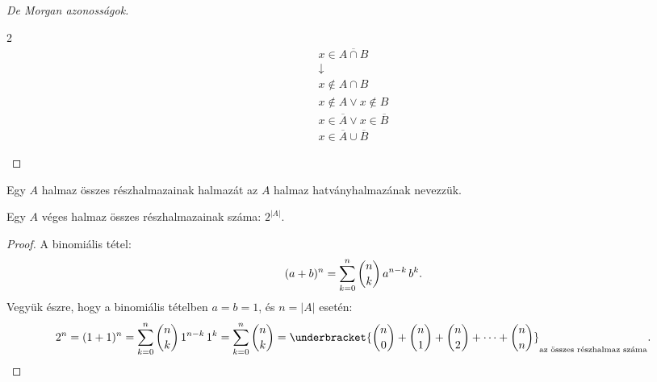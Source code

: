 \begin{theorem}
\begin{proof}[De Morgan azonosságok]
\begin{multicols}{2}
      \begin{gather*}
        x \in \overline{A \cap B}
        \\
        \downarrow
        \\
        x \notin A \cap B
        \\
        x \notin A \lor x \notin B
        \\
        x \in \overline A \lor x \in \overline B
        \\
        x \in \overline A \cup \overline B
      \end{gather*}
    \end{multicols}
  \end{proof}
\end{theorem}

\begin{definition}[Hatványhalmaz]
  Egy $A$ halmaz összes részhalmazainak halmazát az $A$ halmaz hatványhalmazának
  nevezzük.
\end{definition}

\begin{statement}
  Egy $A$ véges halmaz összes részhalmazainak száma: $2^{|A|}$.

  \begin{proof}
    A binomiális tétel:
    \[
      (a + b)^n = \sum_{k=0}^{n} \binom{n}{k} \, a^{n-k} \, b^k
      \text.
    \]
    Vegyük észre, hogy a binomiális tételben $a = b = 1$, és $n = |A|$ esetén:
    \[
      2^n
      = (1 + 1)^n
      = \sum_{k=0}^{n} \binom{n}{k} \, 1^{n-k} \, 1^k
      = \sum_{k=0}^{n} \binom{n}{k}
      = \underbracket{
        \binom n0 + \binom n1 + \binom n2 + \dots + \binom nn
      }_\text{az összes részhalmaz száma}
      \text.
    \]
  \end{proof}
\end{statement}

\clearpage